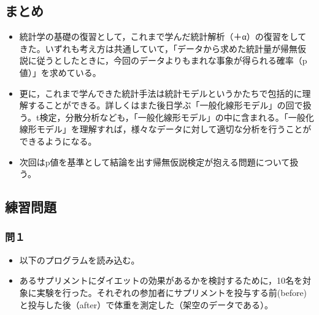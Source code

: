 \documentclass[]{article}
\providecommand{\tightlist}{%
  \setlength{\itemsep}{0pt}\setlength{\parskip}{0pt}}
\begin{document}
\subsection{まとめ}

\begin{itemize}
\tightlist
\item
  統計学の基礎の復習として，これまで学んだ統計解析（＋α）の復習をしてきた。いずれも考え方は共通していて，「データから求めた統計量が帰無仮説に従うとしたときに，今回のデータよりもまれな事象が得られる確率（p値）」を求めている。\\
\item
  更に，これまで学んできた統計手法は統計モデルというかたちで包括的に理解することができる。詳しくはまた後日学ぶ「一般化線形モデル」の回で扱う。t検定，分散分析なども，「一般化線形モデル」の中に含まれる。「一般化線形モデル」を理解すれば，様々なデータに対して適切な分析を行うことができるようになる。\\
\item
  次回はp値を基準として結論を出す帰無仮説検定が抱える問題について扱う。
\end{itemize}

\subsection{練習問題}\label{-6}

\subsubsection{問１}\label{-12}

\begin{itemize}
\item
  以下のプログラムを読み込む。
\item
  あるサプリメントにダイエットの効果があるかを検討するために，10名を対象に実験を行った。それぞれの参加者にサプリメントを投与する前(before)と投与した後（after）で体重を測定した（架空のデータである）。
\end{itemize}
\end{document}
